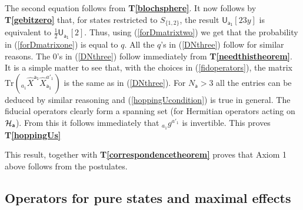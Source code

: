 \documentclass[10pt]{article}
\begin{document}
The second equation follows from {\bf T\ref{blochsphere}}. It now follows by {\bf T\ref{gebitzero}} that, for states restricted to $S_{\{1,2\} }$, the result
$\mathsf{U_{a_1}}[23y]$ is equivalent to $\frac{1}{2} \mathsf{U_{a_1}}[2]$.  Thus, using (\ref{forDmatrixtwo}) we get that the probability in (\ref{forDmatrixone}) is equal to $q$.
All the $q$'s in (\ref{DNthree}) follow for similar reasons.  The $0$'s in (\ref{DNthree}) follow immediately from {\bf T\ref{needthistheorem}}.  It is a simple matter to see that, with the choices in (\ref{fidoperators}), the matrix
$\text{Tr}( {}_{a_1} \hat X^\mathsf{a_1} \hat X_\mathsf{a_1}^{a'_1} )$ is the same as in (\ref{DNthree}).   For $N_\mathsf{a}>3$ all the entries can be deduced by similar reasoning and (\ref{hoppingUcondition}) is true in general.  The fiducial operators clearly form a spanning set (for Hermitian operators acting on ${\cal H}_\mathsf{a}$).  From this it follows immediately that ${}_{a_1} g^{a'_1}$ is invertible.  This proves {\bf T\ref{hoppingUs}}

This result, together with {\bf T\ref{correspondencetheorem}} proves that Axiom 1 above follows from the postulates.




\subsection{Operators for pure states and maximal effects}
\end{document}
